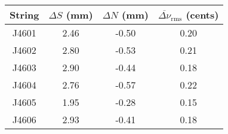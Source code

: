 \begin{tabular}{cccc}
\toprule
String &  $\Delta S$ (mm) &  $\Delta N$ (mm) &  $\overline{\Delta \nu}_\text{rms}$ (cents) \\
\midrule
 J4601 &             2.46 &            -0.50 &                                        0.20 \\
 J4602 &             2.80 &            -0.53 &                                        0.21 \\
 J4603 &             2.90 &            -0.44 &                                        0.18 \\
 J4604 &             2.76 &            -0.57 &                                        0.22 \\
 J4605 &             1.95 &            -0.28 &                                        0.15 \\
 J4606 &             2.93 &            -0.41 &                                        0.18 \\
\bottomrule
\end{tabular}

